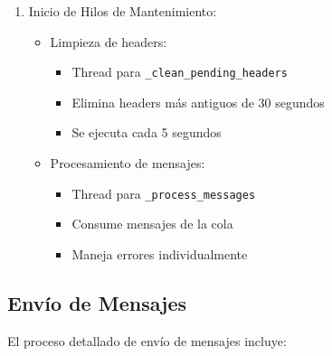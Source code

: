 \documentclass[12pt]{article}
\begin{document}
\begin{enumerate}
    \item Inicio de Hilos de Mantenimiento:
    \begin{itemize}
        \item Limpieza de headers:
        \begin{itemize}
            \item Thread para \texttt{\_clean\_pending\_headers}
            \item Elimina headers más antiguos de 30 segundos
            \item Se ejecuta cada 5 segundos
        \end{itemize}
        \item Procesamiento de mensajes:
        \begin{itemize}
            \item Thread para \texttt{\_process\_messages}
            \item Consume mensajes de la cola
            \item Maneja errores individualmente
        \end{itemize}
    \end{itemize}
\end{enumerate}

\subsection{Envío de Mensajes}
El proceso detallado de envío de mensajes incluye:
\end{document}
